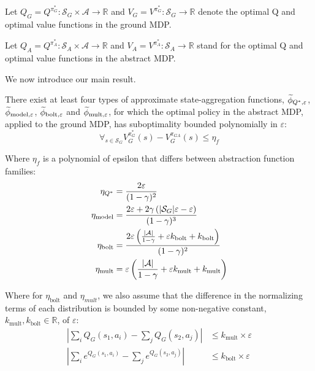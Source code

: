 Let $Q_G = Q^{\pi_G^*} : \mathcal{S}_G \times \mathcal{A} \rightarrow \mathbb{R} $ and $V_G = V^{\pi_G^*}: \mathcal{S}_G \rightarrow \mathbb{R} $ denote the optimal Q and optimal value functions in the ground \ac{MDP}.
\edefn

Let $Q_A  = Q^{\pi_A^*}: \mathcal{S}_A \times \mathcal{A} \rightarrow \mathbb{R}$ and $V_A  = V^{\pi_A^*}: \mathcal{S}_A \rightarrow \mathbb{R}$  stand for the optimal Q and optimal value functions in the abstract \ac{MDP}.
\edefn

We now introduce our main result.

\begin{thm}
There exist at least four types of approximate state-aggregation functions, $\widetilde \phi_{Q^*,\varepsilon}$, $\widetilde \phi_{\text{model},\varepsilon}$, $\widetilde \phi_{\text{bolt},\varepsilon}$ and $\widetilde \phi_{\text{mult},\varepsilon}$, for which the optimal policy in the abstract \ac{MDP}, applied to the ground \ac{MDP}, has suboptimality bounded polynomially in ${\varepsilon}$:
\begin{equation}
\forall_{s \in \mathcal{S}_G} V_G^{\pi_G^*}(s) - V_G^{\pi_{GA}}(s) \leq \eta_f
\end{equation}
\end{thm}

Where $\eta_f$ is a polynomial of epsilon that differs between abstraction function families:
\begin{align*}
\eta_{Q^*} &= \frac{2\varepsilon}{(1-\gamma)^2} \\
\eta_{\text{model}} &= \frac{2\varepsilon + 2\gamma \left( |\mathcal{S}_G|\varepsilon - \varepsilon \right)}{(1-\gamma)^3} \\
\eta_{\text{bolt}} &= \frac{2\varepsilon\left(\frac{|\mathcal{A}|}{1-\gamma} + \varepsilon k_{\text{bolt}} + k_{\text{bolt}}\right)}{(1-\gamma)^2} \\
\eta_{\text{mult}} &= \varepsilon\left(\frac{|\mathcal{A}|}{1-\gamma} + \varepsilon k_{\text{mult}} + k_{\text{mult}}\right)
\end{align*}

Where for $\eta_{\text{bolt}}$ and $\eta_{mult}$, we also assume that the difference in the normalizing terms of each distribution is bounded by some non-negative constant, $k_{\text{mult}}, k_{\text{bolt}} \in \mathbb{R}$, of $\varepsilon$:
\begin{align*}
\left |\sum_i Q_G(s_1,a_i) - \sum_j Q_G(s_2,a_j) \right | &\leq k_{\text{mult}} \times \varepsilon \\
\left |\sum_i e^{Q_G(s_1,a_i)} - \sum_j e^{Q_G(s_2,a_j)} \right | &\leq k_{\text{bolt}} \times \varepsilon \\
\end{align*}

